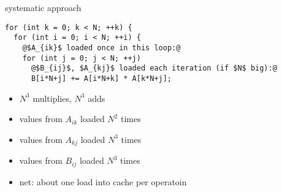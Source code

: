 \begin{frame}[fragile,label=cacheBlockMotivation2]{systematic approach}
\lstset{style=small,language=C,escapechar=@}
\begin{lstlisting}
for (int k = 0; k < N; ++k) {
  for (int i = 0; i < N; ++i) {
    @$A_{ik}$ loaded once in this loop:@
    for (int j = 0; j < N; ++j)
      @$B_{ij}$, $A_{kj}$ loaded each iteration (if $N$ big):@
      B[i*N+j] += A[i*N+k] * A[k*N+j];
\end{lstlisting}
\begin{itemize}
\item $N^3$ multiplies, $N^3$ adds
\item values from $A_{ik}$ loaded $N^2$ times
\item values from $A_{kj}$ loaded $N^3$ times
\item values from $B_{ij}$ loaded $N^3$ times
\item net: about one load into cache per operatoin
\end{itemize}
\end{frame}
